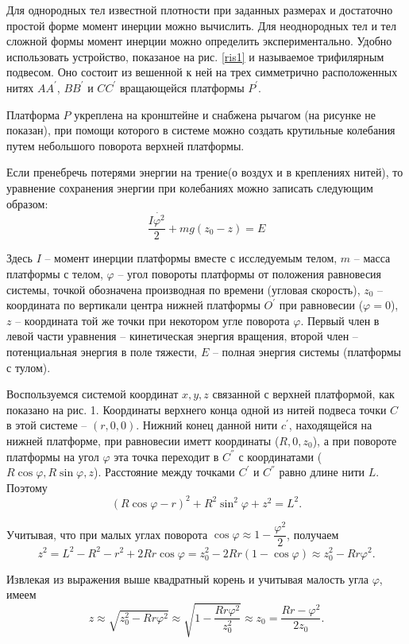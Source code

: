 \documentclass[a4paper,12pt]{article}
\begin{document}
Для однородных тел известной плотности при заданных размерах и достаточно простой форме момент инерции можно вычислить. Для неоднородных тел и тел сложной формы момент инерции можно определить экспериментально. Удобно использовать устройство, показаное на рис. \ref{ris1} и называемое трифилярным подвесом. Оно состоит из вешенной к ней на трех симметрично расположенных нитях $AA^{'}$, $BB^{'}$ и $CC^{'}$ вращающейся платформы $P^{'}$.

Платформа $P$ укреплена на кронштейне и снабжена рычагом (на рисунке не показан), при помощи которого в системе можно создать крутильные колебания путем небольшого поворота верхней платформы.

Если пренебречь потерями энергии на трение(о воздух и в креплениях нитей), то уравнение сохранения энергии при колебаниях можно записать следующим образом:
\[ \frac{I \dot{\varphi^2}}{2} + mg(z_0 - z) = E\]

Здесь $I$ -- момент инерции платформы вместе с исследуемым телом, $m$ -- масса платформы с телом, $\varphi$ -- угол повороты платформы от положения равновесия системы, точкой обозначена производная по времени (угловая скорость), $z_0$ -- координата по вертикали центра нижней платформы $O^{'}$ при равновесии ($\varphi = 0$), $z$ -- координата той же точки при некотором угле поворота $\varphi$. Первый член в левой части уравнения -- кинетическая энергия вращения, второй член -- потенциальная энергия в поле тяжести, $E$ -- полная энергия системы (платформы с тулом).

Воспользуемся системой координат $x,y,z$ связанной с верхней платформой, как показано на рис. 1. Координаты верхнего конца одной из нитей подвеса точки $C$ в 
этой системе -- $(r, 0, 0)$. Нижний конец данной нити $c^{'}$, находящейся на нижней платформе, при равновесии иметт координаты ($R,0,z_0$), а при повороте платформы на угол $\varphi$ эта точка переходит в $C^{''}$ с координатами ($R \cos{\varphi}, R\sin{\varphi},z$). Расстояние между точками $C^{'}$ и $C^{''}$ равно длине нити $L$. Поэтому 
\[ (R\cos{\varphi} - r)^2 +R^2\sin^2{\varphi} +z^2 = L^2 .\]

Учитывая, что при малых углах поворота $\cos{\varphi} \approx 1 -\dfrac{\varphi^2}{2}$, получаем 
\[ z^2 = L^2 - R^2 - r^2 +2Rr\cos{\varphi} = z_0^2 - 2Rr(1 - \cos{\varphi})\approx z_0^2 - Rr\varphi^2 .\]

Извлекая из выражения выше квадратный корень и учитывая малость угла $\varphi$, имеем 
\[ z \approx \sqrt{z_0^2 - Rr\varphi^2}\approx \sqrt{1-\frac{Rr\varphi^2}{z_0^2}}\approx z_0 = \frac{Rr-\varphi^2}{2z_0} .\]
\end{document}
